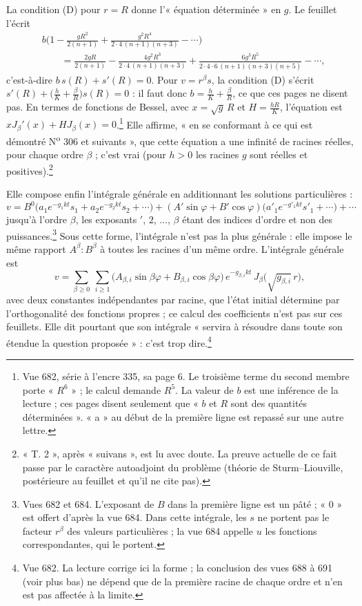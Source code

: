 \documentclass[11pt,a4paper]{article}
\begin{document}
La condition (D) pour $r = R$ donne l'« équation déterminée » en $g$. Le
feuillet l'écrit
\begin{align*}
& b\Big(1 - \frac{gR^2}{2(n+1)} + \frac{g^2R^4}{2\cdot4\,(n+1)(n+3)} - \cdots\Big) \\
& \qquad = \frac{2gR}{2(n+1)} - \frac{4g^2R^3}{2\cdot4\,(n+1)(n+3)} +
\frac{6g^3R^5}{2\cdot4\cdot6\,(n+1)(n+3)(n+5)} - \cdots,
\end{align*}
c'est-à-dire $b\,s(R) + s'(R) = 0$. Pour $v = r^\beta s$, la condition (D)
s'écrit $s'(R) + \big(\frac hK + \frac\beta R\big)s(R) = 0$ : il faut donc $b =
\frac hK + \frac\beta R$, ce que ces pages ne disent pas. En termes de
fonctions de Bessel, avec $x = \sqrt g\,R$ et $H = \frac{hR}{K}$, l'équation
est $x J_\beta'(x) + H J_\beta(x) = 0$.\footnote{Vue 682, série à l'encre 335,
sa page 6. Le troisième terme du second membre porte « $R^6$ » ; le calcul
demande $R^5$. La valeur de $b$ est une inférence de la lecture ; ces pages
disent seulement que « $b$ et $R$ sont des quantités déterminées ». « a » au
début de la première ligne est repassé sur une autre lettre.} Elle affirme,
« en se conformant à ce qui est démontré N\textsuperscript{o} 306 et suivants »,
que cette équation a une infinité de racines réelles, pour chaque ordre
$\beta$ ; c'est vrai (pour $h > 0$ les racines $g$ sont réelles et
positives).\footnote{« T. 2 », après « suivans », est lu avec doute. La preuve
actuelle de ce fait passe par le caractère autoadjoint du problème (théorie de
Sturm--Liouville, postérieure au feuillet et qu'il ne cite pas).}

Elle compose enfin l'intégrale générale en additionnant les solutions
particulières :
\[
v = B^0\big(a_1e^{-g_1kt}s_1 + a_2e^{-g_2kt}s_2 + \cdots\big) +
(A'\sin\varphi + B'\cos\varphi)\big(a'_1e^{-g'_1kt}s'_1 + \cdots\big) + \cdots
\]
jusqu'à l'ordre $\beta$, les exposants $'$, $2$, $\dots$, $\beta$ étant des
indices d'ordre et non des puissances.\footnote{Vues 682 et 684. L'exposant de
$B$ dans la première ligne est un pâté ; « 0 » est offert d'après la vue 684.
Dans cette intégrale, les $s$ ne portent pas le facteur $r^\beta$ des valeurs
particulières ; la vue 684 appelle $u$ les fonctions correspondantes, qui le
portent.} Sous cette forme, l'intégrale n'est pas la plus générale : elle
impose le même rapport $A^\beta : B^\beta$ à toutes les racines d'un même
ordre. L'intégrale générale est
\[
v = \sum_{\beta \geq 0}\ \sum_{i \geq 1}\big(A_{\beta,i}\sin\beta\varphi +
B_{\beta,i}\cos\beta\varphi\big)\,e^{-g_{\beta,i}kt}\,J_\beta\big(\sqrt{g_{\beta,i}}\,
r\big),
\]
avec deux constantes indépendantes par racine, que l'état initial détermine par
l'orthogonalité des fonctions propres ; ce calcul des coefficients n'est pas
sur ces feuillets. Elle dit pourtant que son intégrale « servira à résoudre dans
toute son étendue la question proposée » : c'est trop dire.\footnote{Vue 682.
La lecture corrige ici la forme ; la conclusion des vues 688 à 691 (voir plus
bas) ne dépend que de la première racine de chaque ordre et n'en est pas
affectée à la limite.}
\end{document}

